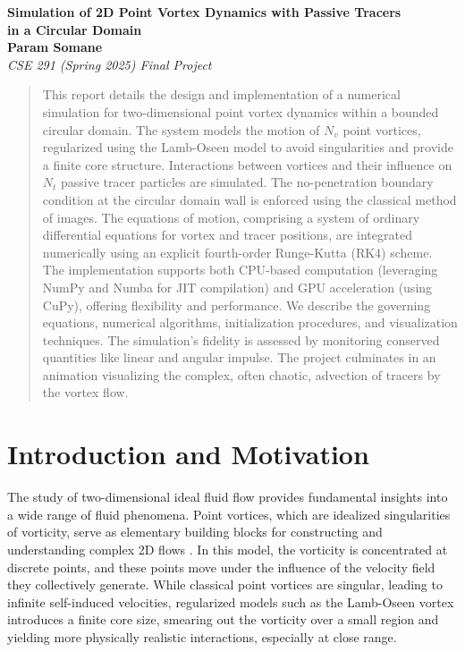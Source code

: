 \documentclass[12pt,letterpaper]{article}
\begin{document}
\begin{center}
    {\Large \textbf{Simulation of 2D Point Vortex Dynamics with Passive Tracers \\ in a Circular Domain}}\\[10pt] %
    \textbf{Param Somane}\\
    \emph{CSE 291 (Spring 2025) Final Project} %
\end{center}

\vspace{1em}

\begin{abstract}
\noindent
This report details the design and implementation of a numerical simulation for two-dimensional point vortex dynamics within a bounded circular domain. The system models the motion of $N_v$ point vortices, regularized using the Lamb-Oseen model to avoid singularities and provide a finite core structure. Interactions between vortices and their influence on $N_t$ passive tracer particles are simulated. The no-penetration boundary condition at the circular domain wall is enforced using the classical method of images. The equations of motion, comprising a system of ordinary differential equations for vortex and tracer positions, are integrated numerically using an explicit fourth-order Runge-Kutta (RK4) scheme. The implementation supports both CPU-based computation (leveraging NumPy and Numba for JIT compilation) and GPU acceleration (using CuPy), offering flexibility and performance. We describe the governing equations, numerical algorithms, initialization procedures, and visualization techniques. The simulation's fidelity is assessed by monitoring conserved quantities like linear and angular impulse. The project culminates in an animation visualizing the complex, often chaotic, advection of tracers by the vortex flow.
\end{abstract}

\section{Introduction and Motivation}
The study of two-dimensional ideal fluid flow provides fundamental insights into a wide range of fluid phenomena. Point vortices, which are idealized singularities of vorticity, serve as elementary building blocks for constructing and understanding complex 2D flows \cite{Saffman1992}. In this model, the vorticity is concentrated at discrete points, and these points move under the influence of the velocity field they collectively generate. While classical point vortices are singular, leading to infinite self-induced velocities, regularized models such as the Lamb-Oseen vortex \cite{Oseen1912} introduces a finite core size, smearing out the vorticity over a small region and yielding more physically realistic interactions, especially at close range.
\end{document}
